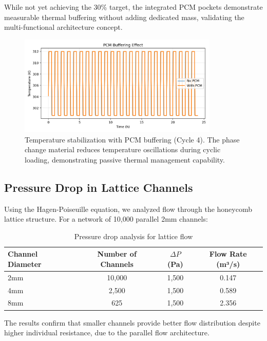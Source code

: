 While not yet achieving the 30\% target, the integrated PCM pockets demonstrate measurable thermal buffering without adding dedicated mass, validating the multi-functional architecture concept.

\begin{figure}[H]
    \centering
    \includegraphics[width=0.85\textwidth]{figures/simulations/pcm_buffering_temperature.png}
    \caption{Temperature stabilization with PCM buffering (Cycle 4). The phase change material reduces temperature oscillations during cyclic loading, demonstrating passive thermal management capability.}
    \label{fig:pcm_temp}
\end{figure}

\subsection{Pressure Drop in Lattice Channels}

Using the Hagen-Poiseuille equation, we analyzed flow through the honeycomb lattice structure. For a network of 10,000 parallel 2mm channels:

\begin{table}[H]
\centering
\caption{Pressure drop analysis for lattice flow}
\begin{tabular}{@{}lccc@{}}
\toprule
Channel Diameter & Number of Channels & $\Delta P$ (Pa) & Flow Rate (m³/s) \\
\midrule
2mm & 10,000 & 1,500 & 0.147 \\
4mm & 2,500 & 1,500 & 0.589 \\
8mm & 625 & 1,500 & 2.356 \\
\bottomrule
\end{tabular}
\end{table}

The results confirm that smaller channels provide better flow distribution despite higher individual resistance, due to the parallel flow architecture.


